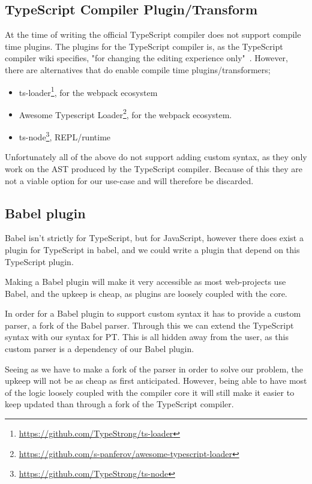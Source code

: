 \subsection{TypeScript Compiler Plugin/Transform}\label{subsec:typescript-compiler-plugin}

At the time of writing the official TypeScript compiler does not support compile time plugins.
The plugins for the TypeScript compiler is, as the TypeScript compiler wiki specifies, "for changing the editing experience only"~\cite{tscplugin}.
However, there are alternatives that do enable compile time plugins/transformers;

\begin{itemize}
    \item ts-loader\footnote{\url{https://github.com/TypeStrong/ts-loader}}, for the webpack ecosystem
    \item Awesome Typescript Loader\footnote{\url{https://github.com/s-panferov/awesome-typescript-loader}}, for the webpack ecosystem.
    \item ts-node\footnote{\url{https://github.com/TypeStrong/ts-node}}, REPL/runtime
\end{itemize}

Unfortunately all of the above do not support adding custom syntax, as they only work on the AST produced by the TypeScript compiler.
Because of this they are not a viable option for our use-case and will therefore be discarded.

\subsection{Babel plugin}\label{subsec:babel-plugin}

Babel isn't strictly for TypeScript, but for JavaScript, however there does exist a plugin for TypeScript in babel, and we could write a plugin that depend on this TypeScript plugin.

Making a Babel plugin will make it very accessible as most web-projects use Babel, and the upkeep is cheap, as plugins are loosely coupled with the core.

In order for a Babel plugin to support custom syntax it has to provide a custom parser, a fork of the Babel parser.
Through this we can extend the TypeScript syntax with our syntax for PT\@.
This is all hidden away from the user, as this custom parser is a dependency of our Babel plugin.

Seeing as we have to make a fork of the parser in order to solve our problem, the upkeep will not be as cheap as first anticipated.
However, being able to have most of the logic loosely coupled with the compiler core it will still make it easier to keep updated than through a fork of the TypeScript compiler.

